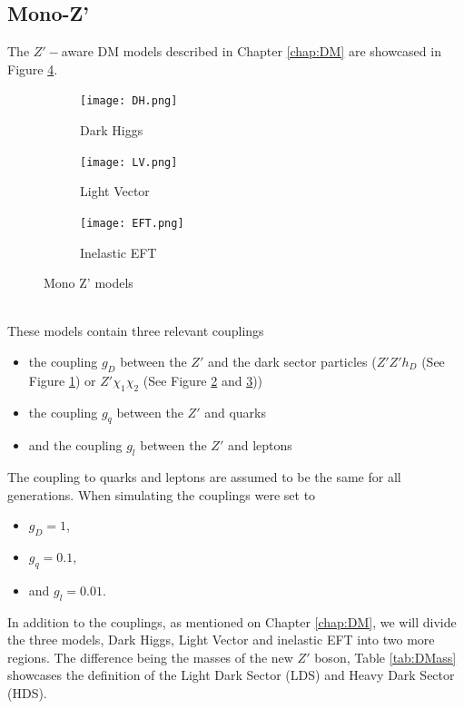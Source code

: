 \documentclass[12pt, a4paper]{book}
\begin{document}
\subsection{Mono-Z'}
The $Z'-$aware DM models described in Chapter \ref{chap:DM} are showcased in Figure \ref{fig:monoZp}. 
\begin{figure}[!ht]
    \centering 
    \begin{subfigure}[b]{0.3\textwidth}
        \centering
        \texttt{[image: DH.png]}
        \caption{Dark Higgs}\label{fig:DH_5}
    \end{subfigure}
    \hfill
    \begin{subfigure}[b]{0.3\textwidth}
        \centering
        \texttt{[image: LV.png]}
        \caption{Light Vector}\label{fig:LV_5}
    \end{subfigure}
    \hfill
    \begin{subfigure}[b]{0.3\textwidth}
        \centering
        \texttt{[image: EFT.png]}
        \caption{Inelastic EFT}\label{fig:EFT_5}
    \end{subfigure}
    \caption{Mono Z' models}\label{fig:monoZp}
\end{figure}
\\These models contain three relevant couplings
\begin{itemize}
    \item the coupling $g_D$ between the $Z'$ and the dark sector particles ($Z'Z'h_D$ (See Figure \ref{fig:DH_5}) or $Z'\chi_1\chi_2$ (See Figure \ref{fig:LV_5} and \ref{fig:EFT_5}))
    \item the coupling $g_q$ between the $Z'$ and quarks
    \item and the coupling $g_l$ between the $Z'$ and leptons
\end{itemize}
The coupling to quarks and leptons are assumed to be the same for all generations. When simulating the couplings were set to
\begin{itemize}
    \item $g_D = 1$,
    \item $g_q=0.1$,
    \item and $g_l=0.01$.
\end{itemize}
In addition to the couplings, as mentioned on Chapter \ref{chap:DM}, we will divide the three models, Dark Higgs, Light Vector and inelastic EFT into two more regions. The difference being the masses of the new $Z'$ boson, Table \ref{tab:DMass} showcases the definition of the Light Dark Sector (LDS) and Heavy Dark Sector (HDS).
\end{document}
